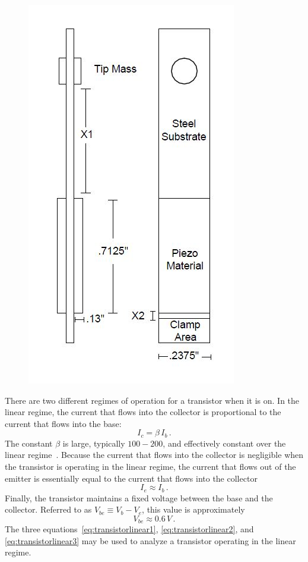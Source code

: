 \documentclass[aps,prl,twocolumn,groupedaddress]{revtex4}
\begin{document}
\begin{figure}[h]
  \caption{}
  \centering
    \includegraphics[scale=0.6]{Bimorph Cantilever.jpg}
\end{figure}


There are two different regimes of operation for a transistor when it is on.  In the linear regime, the current that flows into the collector is proportional to the current that flows into the base:
\begin{equation}
	I_c = \beta \, I_b \, . 
	\label{eq:transistorlinear1}
\end{equation}
The constant $\beta$ is large, typically  $100-200$, and effectively constant over the linear regime~\cite{EssickLecture}.  Because the current that flows into the collector is negligible when the transistor is operating in the linear regime, the current that flows out of the emitter is essentially equal to the current that flows into the collector
\begin{equation}
	I_e \approx I_b \, . 
	\label{eq:transistorlinear2}
\end{equation}
Finally, the transistor maintains a fixed voltage between the base and the collector.  Referred to as $V_{be} \equiv V_b - V_e$, this value is approximately 
\begin{equation}
	V_{be} \approx 0.6 \, V \, .
	\label{eq:transistorlinear3}
\end{equation}
The three equations~\ref{eq:transistorlinear1}, \ref{eq:transistorlinear2}, and \ref{eq:transistorlinear3} may be used to analyze a transistor operating in the linear regime. 
\end{document}
